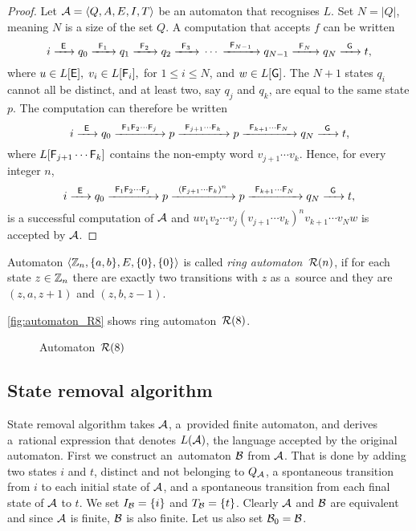 \begin{proof}
    Let ${\mathcal{A}} = \langle Q, A, E, I, T \rangle$ be an automaton that recognises $L$. Set $N = |Q|$, meaning $N$ is a size of the set $Q$. A computation that accepts $f$ can be written
    \[
        i {\; \xrightarrow[]{\: \; {\mathsf{E}} \: \;} \;} q_0 {\; \xrightarrow[]{\: \; {\mathsf{F}}_1 \: \;} \;} q_1 {\; \xrightarrow[]{\: \; {\mathsf{F}}_2 \: \;} \;} q_2 {\; \xrightarrow[]{\: \; {\mathsf{F}}_3 \: \;} \;} \dotsm {\; \xrightarrow[]{\: \; {\mathsf{F}}_{N-1} \: \;} \;} q_{N-1} {\; \xrightarrow[]{\: \; {\mathsf{F}}_{N} \: \;} \;} q_N {\; \xrightarrow[]{\: \; {\mathsf{G}} \: \;} \;} t,
    \]
    where $u \in L[{\mathsf{E}}], \; v_i \in L[{\mathsf{F}}_i], $ for $ 1 \leq i \leq N$, and $w \in L[{\mathsf{G}}]$. The $N + 1$ states $q_i$ cannot all be distinct, and at least two, say $q_j$ and $q_k$, are equal to the same state $p$. The computation can therefore be written
    \[
        i {\; \xrightarrow[]{\: \; {\mathsf{E}} \: \;} \;} q_0 {\; \xrightarrow[]{\: \; {\mathsf{F}}_1 {\mathsf{F}}_2 \dotsm {\mathsf{F}}_j \: \;} \;} p {\; \xrightarrow[]{\: \; {\mathsf{F}}_{j+1} \dotsm {\mathsf{F}}_k \: \;} \;} p {\; \xrightarrow[]{\: \; {\mathsf{F}}_{k+1} \dotsm {\mathsf{F}}_N \: \;} \;} q_N {\; \xrightarrow[]{\: \; {\mathsf{G}} \: \;} \;} t,
    \]
    where $L[{\mathsf{F}}_{j+1} \dotsm {\mathsf{F}}_k]$ contains the non-empty word $v_{j+1} \dotsm v_k$. Hence, for every integer $n$,
    \[
        i {\; \xrightarrow[]{\: \; {\mathsf{E}} \: \;} \;} q_0 {\; \xrightarrow[]{\: \; {\mathsf{F}}_1 {\mathsf{F}}_2 \dotsm {\mathsf{F}}_j \: \;} \;} p {\; \xrightarrow[]{\: \; {({\mathsf{F}}_{j+1} \dotsm {\mathsf{F}}_k)}^n \: \;} \;} p {\; \xrightarrow[]{\: \; {\mathsf{F}}_{k+1} \dotsm {\mathsf{F}}_N \: \;} \;} q_N {\; \xrightarrow[]{\: \; {\mathsf{G}} \: \;} \;} t,
    \]
    is a successful computation of ${\mathcal{A}}$ and $u v_1 v_2 \dotsm v_j {(v_{j+1} \dotsm v_k)}^n v_{k+1} \dotsm v_N w$ is accepted by ${\mathcal{A}}$.
\end{proof}

\begin{defn}
    Automaton $\langle \mathbb{Z}_n, \{a,b\}, E, \{0\}, \{0\} \rangle$ is called \emph{ring automaton~${{\mathcal{R}}(n)}$}, if for each state $z \in \mathbb{Z}_n$ there are exactly two transitions with $z$ as a~source and they are $(z, a, z+1)$ and $(z, b, z-1)$.
\end{defn}

\begin{example}
    \autoref*{fig:automaton_R8} shows ring automaton~${{\mathcal{R}}(8)}$.

    \begin{figure}[h]
        \centering
        
        \caption{Automaton~${{\mathcal{R}}(8)}$}\label{fig:automaton_R8}
    \end{figure}
\end{example}

\subsection{State removal algorithm}

State removal algorithm takes ${\mathcal{A}}$, a~provided finite automaton, and derives a~rational expression that denotes $L({\mathcal{A}})$, the language accepted by the original automaton. First we construct an~automaton ${\mathcal{B}}$ from ${\mathcal{A}}$. That is done by adding two states $i$ and $t$, distinct and not belonging to $Q_{{\mathcal{A}}}$, a spontaneous transition from $i$ to each initial state of ${\mathcal{A}}$, and a spontaneous transition from each final state of ${\mathcal{A}}$ to $t$. We set $I_{{\mathcal{B}}} = \{i\}$ and $T_{{\mathcal{B}}} = \{t\}$. Clearly ${\mathcal{A}}$ and ${\mathcal{B}}$ are equivalent and since ${\mathcal{A}}$ is finite, ${\mathcal{B}}$ is also finite. Let us also set ${\mathcal{B}}_0 = {\mathcal{B}}$.

